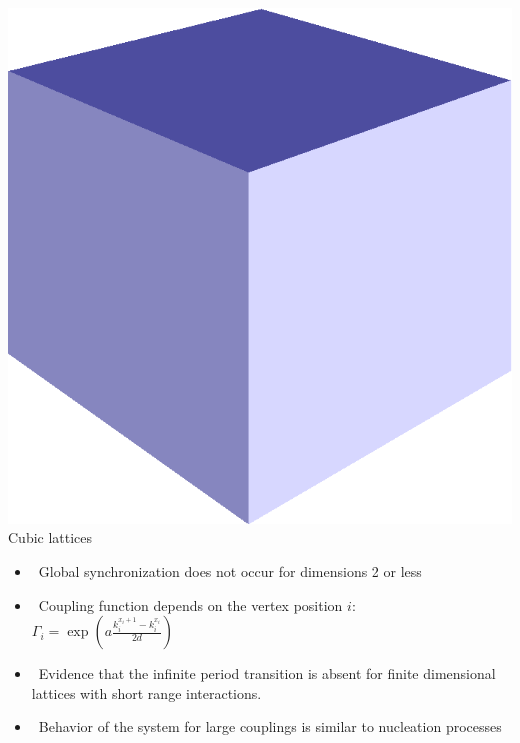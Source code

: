 \documentclass[serif,mathserif]{beamer}
\begin{document}
\begin{frame}{\includegraphics[height=0.06\textheight]{cube.eps}\hspace{0.25cm} Cubic lattices}
    \begin{itemize}
        \vspace{0.25cm}
        \item \ \pause Global synchronization does not occur for dimensions 2 or less
        \vspace{0.25cm}
        \item \ \pause Coupling function depends on the vertex position $i$:\\
            $\Gamma_i = \exp \left( a\frac{k_i^{x_i+1} - k_i^{x_i}}{2d} \right)$
        \vspace{0.25cm}
        \item \ \pause Evidence that the infinite period transition is absent for finite dimensional lattices with short range interactions.
        \vspace{0.25cm}
        \item \ \pause Behavior of the system for large couplings is similar to nucleation processes
    \end{itemize}
\end{frame}
\end{document}
